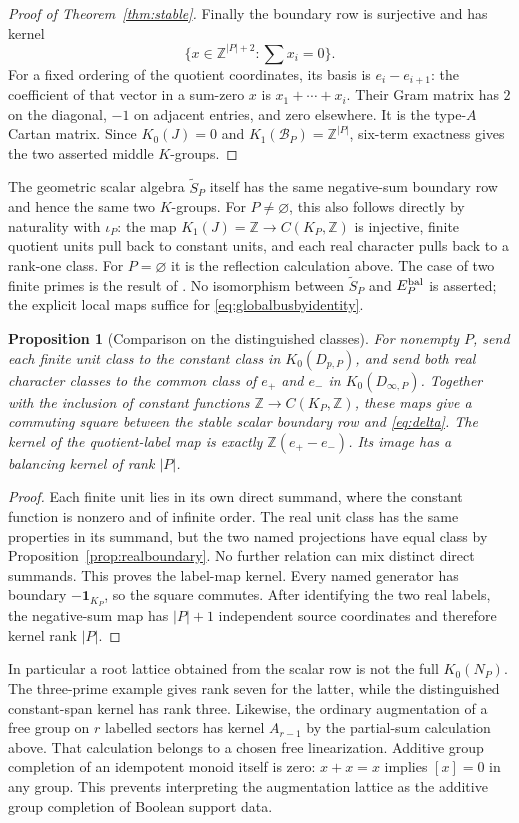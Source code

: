 \documentclass[11pt]{article}
\newcommand{\Z}{\mathbb Z}
\newcommand{\one}{\mathbf 1}
\newtheorem{proposition}[theorem]{Proposition}
\theoremstyle{definition}
\theoremstyle{remark}
\begin{document}
\begin{proof}[Proof of Theorem~\ref{thm:stable}]
Finally the boundary row is surjective and has kernel
\[
 \{x\in\Z^{|P|+2}:\textstyle\sum x_i=0\}.
\]
For a fixed ordering of the quotient coordinates, its basis is $e_i-e_{i+1}$: the coefficient of that vector in a sum-zero $x$ is $x_1+\cdots+x_i$. Their Gram matrix has $2$ on the diagonal, $-1$ on adjacent entries, and zero elsewhere. It is the type-$A$ Cartan matrix. Since $K_0(J)=0$ and $K_1(\mathcal B_P)=\Z^{|P|}$, six-term exactness gives the two asserted middle $K$-groups.
\end{proof}

The geometric scalar algebra $\widetilde S_P$ itself has the same negative-sum boundary row and hence the same two $K$-groups. For $P\ne\varnothing$, this also follows directly by naturality with $\iota_P$: the map $K_1(J)=\Z\to C(K_P,\Z)$ is injective, finite quotient units pull back to constant units, and each real character pulls back to a rank-one class. For $P=\varnothing$ it is the reflection calculation above. The case of two finite primes is the result of \citet[\S5.4]{CC}. No isomorphism between $\widetilde S_P$ and $E_P^{\rm bal}$ is asserted; the explicit local maps suffice for \eqref{eq:globalbusbyidentity}.

\begin{proposition}[Comparison on the distinguished classes]\label{prop:labels}
For nonempty $P$, send each finite unit class to the constant class in $K_0(D_{p,P})$, and send both real character classes to the common class of $e_+$ and $e_-$ in $K_0(D_{\infty,P})$. Together with the inclusion of constant functions $\Z\to C(K_P,\Z)$, these maps give a commuting square between the stable scalar boundary row and \eqref{eq:delta}. The kernel of the quotient-label map is exactly $\Z(e_+-e_-)$. Its image has a balancing kernel of rank $|P|$.
\end{proposition}
\begin{proof}
Each finite unit lies in its own direct summand, where the constant function is nonzero and of infinite order. The real unit class has the same properties in its summand, but the two named projections have equal class by Proposition~\ref{prop:realboundary}. No further relation can mix distinct direct summands. This proves the label-map kernel. Every named generator has boundary $-\one_{K_P}$, so the square commutes. After identifying the two real labels, the negative-sum map has $|P|+1$ independent source coordinates and therefore kernel rank $|P|$.
\end{proof}

In particular a root lattice obtained from the scalar row is not the full $K_0(N_P)$. The three-prime example gives rank seven for the latter, while the distinguished constant-span kernel has rank three. Likewise, the ordinary augmentation of a free group on $r$ labelled sectors has kernel $A_{r-1}$ by the partial-sum calculation above. That calculation belongs to a chosen free linearization. Additive group completion of an idempotent monoid itself is zero: $x+x=x$ implies $[x]=0$ in any group. This prevents interpreting the augmentation lattice as the additive group completion of Boolean support data.
\end{document}
